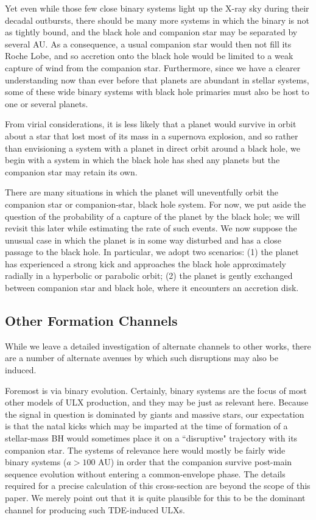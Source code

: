 Yet even while those few close binary systems light up the X-ray sky
during their decadal outbursts, there should be many more systems in
which the binary is not as tightly bound, and the black hole and
companion star may be separated by several AU.  As a consequence, a
usual companion star would then not fill its Roche Lobe, and so
accretion onto the black hole would be limited to a weak capture of
wind from the companion star.  Furthermore, since we have a clearer
understanding now than ever before that planets are abundant in
stellar systems, some of these wide binary systems with black hole
primaries must also be host to one or several planets.  


From virial considerations, it is less likely that a planet would
survive in orbit about a star that lost most of its mass in a
supernova explosion, and so rather than envisioning a system with a
planet in direct orbit around a black hole, we begin with a system in
which the black hole has shed any planets but the companion star may
retain its own.


There are many situations in which the planet will uneventfully orbit
the companion star or companion-star, black hole system.  For now, we
put aside the question of the probability of a capture of the planet
by the black hole; we will revisit this later while estimating the
rate of such events.  We now suppose the unusual case in which the
planet is in some way disturbed and has a close passage to the black
hole.  In particular, we adopt two scenarios: (1) the planet has
experienced a strong kick and approaches the black hole approximately
radially in a hyperbolic or parabolic orbit; (2) the planet is gently
exchanged between companion star and black hole, where it encounters
an accretion disk.


\subsection{Other Formation Channels}
While we leave a detailed investigation of alternate channels to other works, 
there are a number of alternate avenues by which such disruptions may also be induced.

Foremost is via binary evolution.  Certainly, binary systems are the focus of most other
models of ULX production, and they may be just as relevant here.  Because the signal in question is dominated by giants and massive stars, our expectation is that the natal kicks which may be imparted at the time of formation of a stellar-mass BH would sometimes place it on a ``disruptive" trajectory with its companion star.  The systems of relevance here would mostly be fairly wide binary systems ($a > 100$ AU) in order that the companion survive post-main sequence evolution without entering a common-envelope phase.   The details required for a precise calculation of this cross-section are beyond the scope of this paper.  We merely point out that it is quite plausible for this to be the dominant channel for producing such TDE-induced ULXs.


